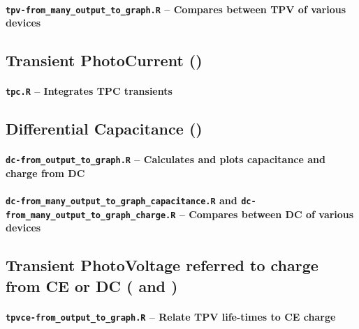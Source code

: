		\paragraph{\texttt{tpv-from\_many\_output\_to\_graph.R} -- Compares between TPV of various devices}
%
	\subsection{Transient PhotoCurrent ()}\label{r_tpc}
%
		\paragraph{\texttt{tpc.R} -- Integrates TPC transients}
%
%
	\subsection{Differential Capacitance ()}\label{r_dc}
%
		\paragraph{\texttt{dc-from\_output\_to\_graph.R} -- Calculates and plots capacitance and charge from DC}
%		
%		
		\paragraph{\texttt{dc-from\_many\_output\_to\_graph\_capacitance.R} and \texttt{dc-from\_many\_output\_to\_graph\_charge.R} -- Compares between DC of various devices}
%		
%
	\subsection{Transient PhotoVoltage referred to charge from CE or DC ( and )}\label{r_tpvcedc}
%
%
%
		\paragraph{\texttt{tpvce-from\_output\_to\_graph.R} -- Relate TPV life\hyp{}times to CE charge}
%		
